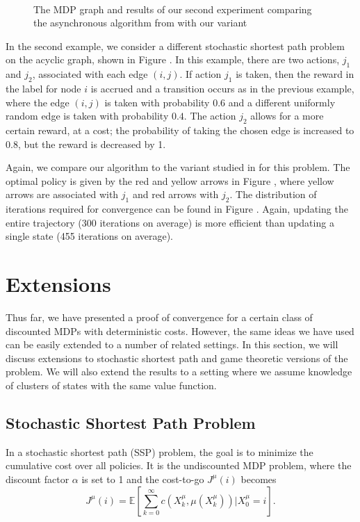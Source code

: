 \documentclass[12pt]{article}
\begin{document}
\begin{figure}[ht]
    \centering
    \\
    \label{fig:sim2}
   \caption{The MDP graph and results of our second experiment comparing the asynchronous algorithm from \cite{tsitsiklis2002convergence} with our variant}
\end{figure}

In the second example, we consider a different stochastic shortest path problem on the acyclic graph, shown in Figure . In this example, there are two actions, $j_1$ and $j_2$, associated with each edge $(i,j)$. If action $j_1$ is taken, then the reward in the label for node $i$ is accrued and a transition occurs as in the previous example, where the edge $(i,j)$ is taken with probability 0.6 and a different uniformly random edge is taken with probability $0.4$. The action $j_2$ allows for a more certain reward, at a cost; the probability of taking the chosen edge is increased to 0.8, but the reward is decreased by 1.

Again, we compare our algorithm to the variant studied in \cite{tsitsiklis2002convergence} for this problem. The optimal policy is given by the red and yellow arrows in Figure , where yellow arrows are associated with $j_1$ and red arrows with $j_2$. The distribution of iterations required for convergence can be found in Figure . Again, updating the entire trajectory (300 iterations on average) is more efficient than updating a single state (455 iterations on average).


\section{Extensions}

Thus far, we have presented a proof of convergence for a certain class of discounted MDPs with deterministic costs. However, the same ideas we have used can be easily extended to a number of related settings. In this section, we will discuss extensions to stochastic shortest path and game theoretic versions of the problem. We will also extend the results to a setting where we
assume knowledge of clusters of states with the same value function.

\subsection{Stochastic Shortest Path Problem} \label{SSP}
In a stochastic shortest path (SSP) problem, the goal is to minimize the cumulative cost over all policies. It is the undiscounted MDP problem, where the discount factor $\alpha$ is set to 1 and the cost-to-go $J^\mu(i)$ becomes
\begin{equation*}
J^{\mu}(i) = \mathbb{E}\left[\sum_{k=0}^\infty c(X_k^\mu, \mu(X_k^\mu)) | X_0^\mu = i\right].
\end{equation*}
\end{document}
